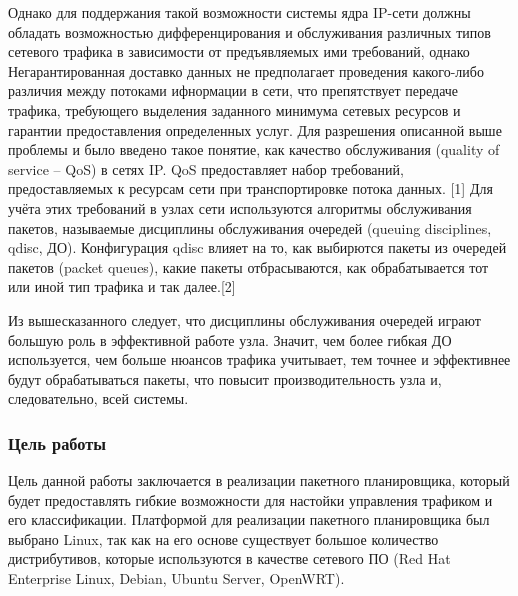     	Однако для поддержания такой возможности системы ядра IP-сети должны обладать
        возможностью дифференцирования и обслуживания различных типов сетевого трафика в
        зависимости от предъявляемых ими требований, однако Негарантированная доставко
    	данных не предполагает проведения какого-либо различия между потоками ифнормации
    	в сети, что препятствует передаче трафика, требующего выделения заданного минимума сетевых
        ресурсов и гарантии предоставления определенных услуг. Для разрешения описанной
        выше проблемы и было введено такое понятие, как качество обслуживания (quality of
        service -- QoS) в сетях IP. QoS предоставляет набор требований, предоставляемых к
    	ресурсам сети при транспортировке потока данных. [1]
    	Для учёта этих требований в узлах сети используются алгоритмы обслуживания пакетов,
    	называемые дисциплины обслуживания очередей (queuing disciplines, qdisc, ДО). Конфигурация
    	qdisc влияет на то, как выбирются пакеты из очередей пакетов (packet queues), какие
    	пакеты отбрасываются, как обрабатывается тот или иной тип трафика и так далее.[2]

    	Из вышесказанного следует, что дисциплины обслуживания очередей играют большую
    	роль в эффективной работе узла. Значит, чем более гибкая ДО используется, чем
    	больше нюансов трафика учитывает, тем точнее и эффективнее будут обрабатываться
    	пакеты, что повысит производительность узла и, следовательно, всей системы.

    	\subsubsection{Цель работы}

    	Цель данной работы заключается в реализации пакетного планировщика,
    	который будет предоставлять гибкие возможности для настойки управления трафиком и
    	его классификации. Платформой для реализации пакетного планировщика был выбрано Linux,
    	так как на его основе существует большое количество дистрибутивов, которые используются
    	в качестве сетевого ПО (Red Hat Enterprise Linux, Debian, Ubuntu Server, OpenWRT).






